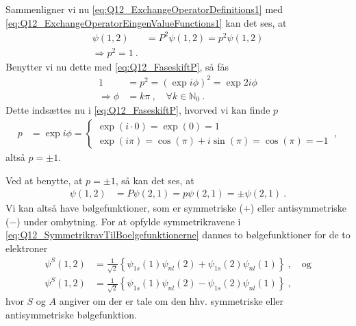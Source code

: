 Sammenligner vi nu \cref{eq:Q12_ExchangeOperatorDefinitions1} med \cref{eq:Q12_ExchangeOperatorEingenValueFunctions1} kan det ses, at
\begin{align}
    \psi(1,2) &= P^2 \psi(1,2) = p^2 \psi(1,2) \nonumber\\
    \Rightarrow p^2 = 1 \: .
\end{align}
Benytter vi nu dette med \cref{eq:Q12_FaseskiftP}, så fås
\begin{align}
    1 &= p^2 = \left(\exp{i\phi}\right)^2 = \exp{2i\phi} \nonumber\\
    \Rightarrow \phi &= k\pi \: , \quad \forall k \in \mathbb{N}_0 \: .
\end{align}
Dette indsættes nu i \cref{eq:Q12_FaseskiftP}, hvorved vi kan finde $p$
\begin{align}
    p &= \exp{i\phi} =
        \begin{cases}
            \exp(i \cdot 0) = \exp(0) = 1 \\
            \exp(i\pi) = \cos(\pi) + i\sin(\pi) = \cos(\pi) = -1
        \end{cases} \: ,
\end{align}
altså $p = \pm 1$.

Ved at benytte, at $p = \pm 1$, så kan det ses, at
\begin{align} \label{eq:Q12_SymmetrikravTilBoelgefunktionerne}
    \psi(1,2) &= P\psi(2,1) = p\psi(2,1) = \pm \psi(2,1) \: .
\end{align}
Vi kan altså have bølgefunktioner, som er symmetriske ($+$) eller antisymmetriske ($-$) under ombytning. For at opfylde symmetrikravene i \cref{eq:Q12_SymmetrikravTilBoelgefunktionerne} dannes to bølgefunktioner for de to elektroner
\begin{align}
    \psi^S(1,2) &= \frac{1}{\sqrt{2}} \left\{\psi_{1s}(1)\psi_{nl}(2) + \psi_{1s}(2)\psi_{nl}(1)\right\} \: , \quad \text{og} \\
    \psi^S(1,2) &= \frac{1}{\sqrt{2}} \left\{\psi_{1s}(1)\psi_{nl}(2) - \psi_{1s}(2)\psi_{nl}(1)\right\} \: ,
\end{align}
hvor $S$ og $A$ angiver om der er tale om den hhv. symmetriske eller antisymmetriske bølgefunktion.


